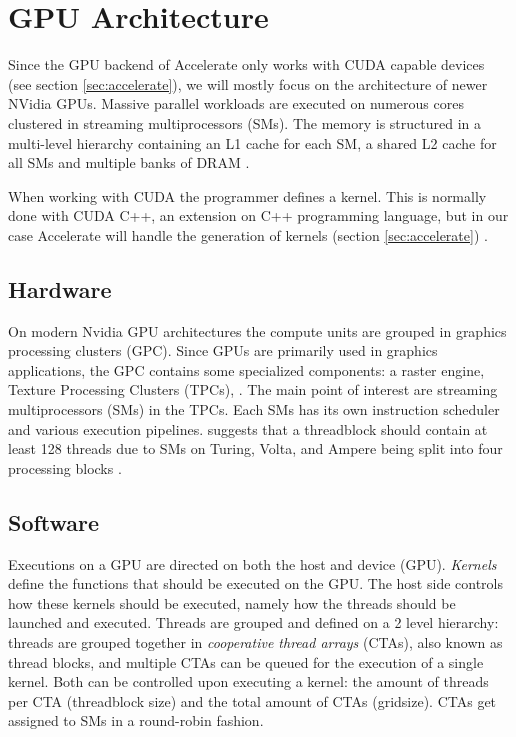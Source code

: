 
\section{GPU Architecture}
Since the GPU backend of Accelerate only works with CUDA capable devices (see section \ref{sec:accelerate}), we will mostly focus on the architecture of newer NVidia GPUs.
Massive parallel workloads are executed on numerous cores clustered in streaming multiprocessors (SMs).
The memory is structured in a multi-level hierarchy containing an L1 cache for each SM, a shared L2 cache for all SMs and multiple banks of DRAM \cite{nvidia2017volta,nvidia2020ampere}.

When working with CUDA the programmer defines a kernel.
This is normally done with CUDA C++, an extension on C++ programming language, but in our case Accelerate will handle the generation of kernels (section \ref{sec:accelerate}) \cite{nvidia2021cudadocs}.

\subsection{Hardware}
On modern Nvidia GPU architectures the compute units are grouped in graphics processing clusters (GPC).
Since GPUs are primarily used in graphics applications, the GPC contains some specialized components: a raster engine, Texture Processing Clusters (TPCs), \TODO{\dots}.
The main point of interest are streaming multiprocessors (SMs) in the TPCs.
Each SMs has its own instruction scheduler and various execution pipelines.
\citeauthor{jia2019dissecting} suggests that a threadblock should contain at least 128 threads due to SMs on Turing, Volta, and Ampere being split into four processing blocks \cite{jia2019dissecting,nvidia2017volta,nvidia2018turing,nvidia2020ampere}.


\subsection{Software}
Executions on a GPU are directed on both the host and device (GPU).
\textit{Kernels} define the functions that should be executed on the GPU.
The host side controls how these kernels should be executed, namely how the threads should be launched and executed.
Threads are grouped and defined on a 2 level hierarchy: threads are grouped together in \textit{cooperative thread arrays} (CTAs), also known as thread blocks, and multiple CTAs can be queued for the execution of a single kernel.
Both can be controlled upon executing a kernel: the amount of threads per CTA (threadblock size) and the total amount of CTAs (gridsize).
CTAs get assigned to SMs in a round-robin fashion.

